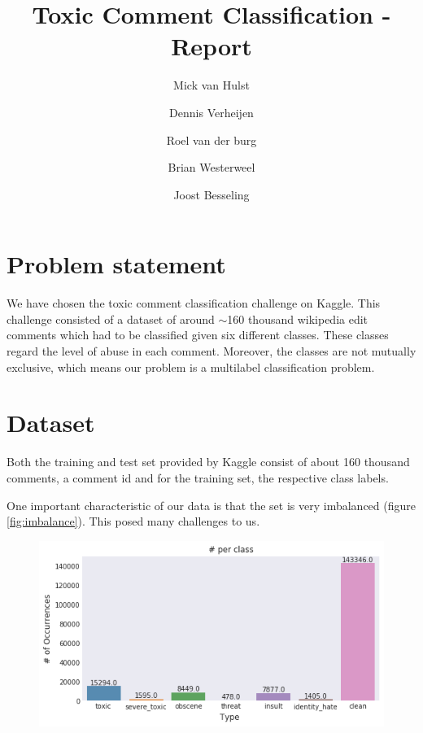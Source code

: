 \documentclass[10pt, a4paper]{article}
\title{Toxic Comment Classification - Report}
\author{Mick van Hulst \and Dennis Verheijen \and Roel van der burg \and Brian Westerweel \and Joost Besseling}
\begin{document}
	\maketitle
	
	
	\begin{multicols}{2}
		
		\section{Problem statement}
		We have chosen the toxic comment classification challenge on Kaggle. This challenge consisted of a dataset of around $\sim$160 thousand wikipedia edit comments which had to be classified given six different classes. These classes regard the level of abuse in each comment. Moreover, the classes are not mutually exclusive, which means our problem is a multilabel classification problem.
		
		\section{Dataset}
		
		Both the training and test set provided by Kaggle consist of about 160 thousand comments, a comment id and for the training set, the respective class labels.
		
		One important characteristic of our data is that the set is very imbalanced (figure \ref{fig:imbalance}). This posed many challenges to us.
		
		
		\begin{figure}[h]
			\centering
			\includegraphics[width=0.5\linewidth]{img/distribution_histogram.png}
		\end{figure}
		
	\end{multicols}
	
\end{document}
